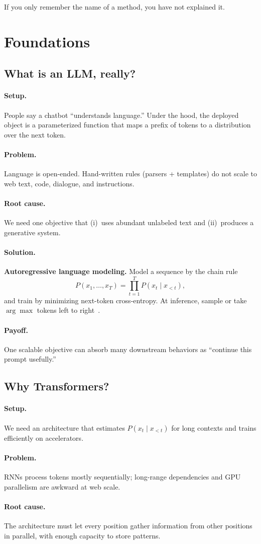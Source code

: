 \documentclass[11pt,a4paper]{article}
\newcommand{\layer}[1]{\paragraph{#1.}}
\newcommand{\setup}{\layer{Setup}}
\newcommand{\problem}{\layer{Problem}}
\newcommand{\rootcause}{\layer{Root cause}}
\newcommand{\solution}{\layer{Solution}}
\newcommand{\payoff}{\layer{Payoff}}
\begin{document}
If you only remember the name of a method, you have not explained it.

\section{Foundations}
\label{sec:foundations}

\subsection{What is an LLM, really?}
\label{sec:what-llm}

\setup
People say a chatbot ``understands language.''
Under the hood, the deployed object is a parameterized function that maps a prefix of tokens to a distribution over the next token.

\problem
Language is open-ended. Hand-written rules (parsers + templates) do not scale to web text, code, dialogue, and instructions.

\rootcause
We need one objective that (i)~uses abundant unlabeled text and (ii)~produces a generative system.

\solution
\textbf{Autoregressive language modeling.}
Model a sequence by the chain rule
\begin{equation}
P(x_1,\ldots,x_T)=\prod_{t=1}^{T} P(x_t \mid x_{<t}),
\end{equation}
and train by minimizing next-token cross-entropy.
At inference, sample or take \(\arg\max\) tokens left to right~\cite{brown2020language}.

\payoff
One scalable objective can absorb many downstream behaviors as ``continue this prompt usefully.''

\subsection{Why Transformers?}
\label{sec:transformer}

\setup
We need an architecture that estimates \(P(x_t\mid x_{<t})\) for long contexts and trains efficiently on accelerators.

\problem
RNNs process tokens mostly sequentially; long-range dependencies and GPU parallelism are awkward at web scale.

\rootcause
The architecture must let every position gather information from other positions in parallel, with enough capacity to store patterns.
\end{document}
